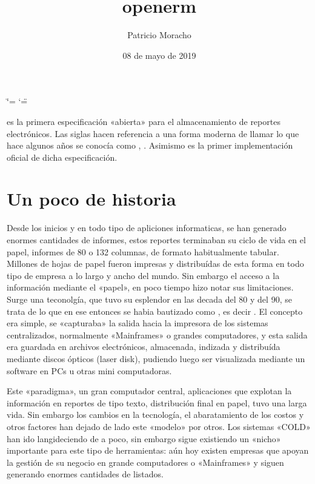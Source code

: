 \documentclass[a4paper,12pt,spanish]{sphinxmanual}
\title{openerm}
\date{08 de mayo de 2019}
\author{Patricio Moracho}
\begin{document}
\ifdefined\shorthandoff
  \ifnum\catcode`\=\string=\active\shorthandoff{=}\fi
  \ifnum\catcode`\"=\active{}\fi
\fi

\pagestyle{empty}

	
\pagestyle{plain}
\sphinxtableofcontents
\pagestyle{normal}
\label{\detokenize{index::doc}}


 es la primera especificación «abierta» para el almacenamiento de
reportes electrónicos. Las siglas  hacen referencia a  una forma moderna de llamar lo que hace algunos años se
conocía como , . Asimismo es la primer
implementación oficial de dicha especificación.


\chapter{Un poco de historia}
\label{\detokenize{index:un-poco-de-historia}}
Desde los inicios y en todo tipo de apliciones informaticas, se han generado
enormes cantidades de informes, estos reportes terminaban su ciclo de vida en
el papel, informes de 80 o 132 columnas, de formato habitualmente tabular.
Millones de hojas de papel fueron impresas y distribuídas de esta forma en todo
tipo de empresa a lo largo y ancho del mundo. Sin embargo el acceso a la
información mediante el «papel», en poco tiempo hizo notar sus limitaciones.
Surge una teconolgía, que tuvo su esplendor en las decada del 80 y del 90, se
trata de lo que en ese entonces se habia bautizado como , es decir
. El concepto era simple, se «capturaba» la
salida hacia la impresora de los sistemas centralizados, normalmente
«Mainframes» o grandes computadores, y esta salida era guardada en archivos
electrónicos, almacenada, indizada y distribuída mediante discos ópticos (laser
disk), pudiendo luego ser visualizada mediante un software  en PCs u
otras mini computadoras.

Este «paradigma», un gran computador central, aplicaciones que
explotan la información en reportes de tipo texto, distribución final
en papel, tuvo una larga vida. Sin embargo los cambios en la
tecnología, el abaratamiento de los costos y otros factores han dejado
de lado este «modelo» por otros. Los sistemas «COLD» han ido langideciendo
de a poco, sin embargo sigue existiendo un «nicho» importante para este
tipo de herramientas: aún hoy existen empresas que apoyan la gestión
de su negocio en grande computadores o «Mainframes» y siguen generando
enormes cantidades de listados.
\end{document}
